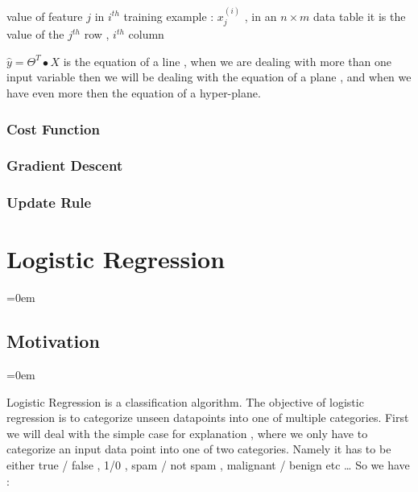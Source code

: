 value of feature $j$ in $i^{th}$ training example : $ x_{j}^{(i)} $ , in an $ n
\times m$ data table it is the value of the $j^{th}$ row , $i^{th}$ column

$ \hat{y}  = \Theta^{T} \bullet X $ is the equation of a line , when we are
dealing with more than one input variable then we will be dealing with the
equation of a plane , and when we have even more then the equation of a
hyper-plane.


\subsubsectionend
\subsubsection{Cost Function}
\label{sssec:cost_function}



\subsubsectionend
\subsubsection{Gradient Descent}
\label{sssec:gradient_descent}



\subsubsectionend
\subsubsection{Update Rule}
\label{sssec:update_rule}



\subsubsectionend

\subsectionend

\section{Logistic Regression}
\label{sec:logistic_regression}
\parindent=0em

\subsection{Motivation}
\label{ssec:motivation}
\parindent=0em

Logistic Regression is a classification algorithm. The objective of logistic
regression is to categorize unseen datapoints into one of multiple categories.
First we will deal with the simple case for explanation , where we only have to
categorize an input data point into one of two categories. Namely it has to be
either true / false , 1/0 , spam / not spam , malignant / benign etc \ldots
So we have :


